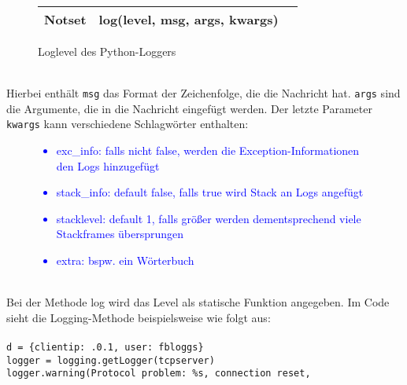 {\begin{figure}[h]
{\begin{tabular}[h]{|p{1.5cm}|p{5cm}|p{6cm}|}
                \hline
                Notset   & log(level, msg, args, kwargs) &                                                                                \\
                \hline
            \end{tabular}\caption{Loglevel des Python-Loggers}\label{fig:figure2}}
    \end{figure}
    \\
    Hierbei enthält \texttt{msg} das Format der Zeichenfolge, die die Nachricht hat.
    \texttt{args} sind die Argumente, die in die Nachricht eingefügt werden.
    Der letzte Parameter \texttt{kwargs} kann verschiedene Schlagwörter enthalten:
    \begin{figure}[h]
        \centering
        \textcolor{blue}{
            \begin{itemize}[noitemsep]
                \item exc\_info: falls nicht false, werden die Exception-Informationen den Logs hinzugefügt
                \item stack\_info: default false, falls true wird Stack an Logs angefügt
                \item stacklevel: default 1, falls größer werden dementsprechend viele Stackframes übersprungen
                \item extra: bspw.
                ein Wörterbuch
            \end{itemize}
            \label{fig:}}
    \end{figure}
    \\
    Bei der Methode log wird das Level als statische Funktion angegeben.
    Im Code sieht die Logging-Methode beispielsweise wie folgt aus:
    \\
    \\
    \hspace*{10mm}
    \texttt{d = \{\textquotesingle clientip\textquotesingle : .0.1\textquotesingle, \textquotesingle user\textquotesingle: \textquotesingle fbloggs\textquotesingle \}}
    \\
    \hspace*{10mm}
    \texttt{logger = logging.getLogger(\textquotesingle tcpserver\textquotesingle )}
    \\
    \hspace*{10mm}
    \texttt{logger.warning(\textquotesingle Protocol problem: \%s\textquotesingle , \textquotesingle connection reset\textquotesingle ,
        \\
        \hspace*{30mm}
}}
